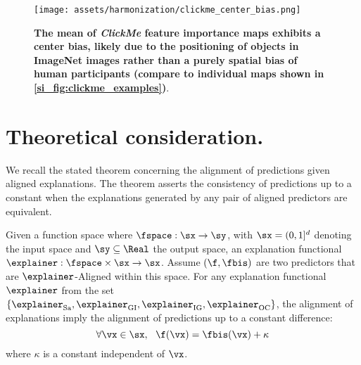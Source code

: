 \begin{figure}[h!]
\begin{center}
   \texttt{[image: assets/harmonization/clickme\_center\_bias.png]}
\end{center}
   \caption{\textbf{The mean of \textit{ClickMe} feature importance maps exhibits a center bias, likely due to the positioning of objects in ImageNet images rather than a purely spatial bias of human participants (compare to individual maps shown in \ref{si_fig:clickme_examples})}.}
\label{si_fig:center_bias}
\end{figure}

\clearpage

\section{Theoretical consideration.}

We recall the stated theorem concerning the alignment of predictions given aligned explanations. The theorem asserts the consistency of predictions up to a constant when the explanations generated by any pair of aligned predictors are equivalent.

\begin{theorem}
\label{app:harmonization:thm}
Given a function space where $\fspace : \sx \to \sy$, with $\sx = (0, 1]^d$ denoting the input space and $\sy \subseteq \Real$ the output space, an explanation functional $\explainer : \fspace \times \sx \to \sx$. Assume $(\f, \fbis)$ are two predictors that are $\explainer$-Aligned within this space. For any explanation functional $\explainer$ from the set $\{ \explainer_{\text{Sa}}, \explainer_{\text{GI}}, \explainer_{\text{IG}}, \explainer_{\text{OC}} \}$, the alignment of explanations imply the alignment of predictions up to a constant difference:
\[
\forall \vx \in \sx, ~~ \f(\vx) = \fbis(\vx) + \kappa
\]
where $\kappa$ is a constant independent of $\vx$.
\end{theorem}

